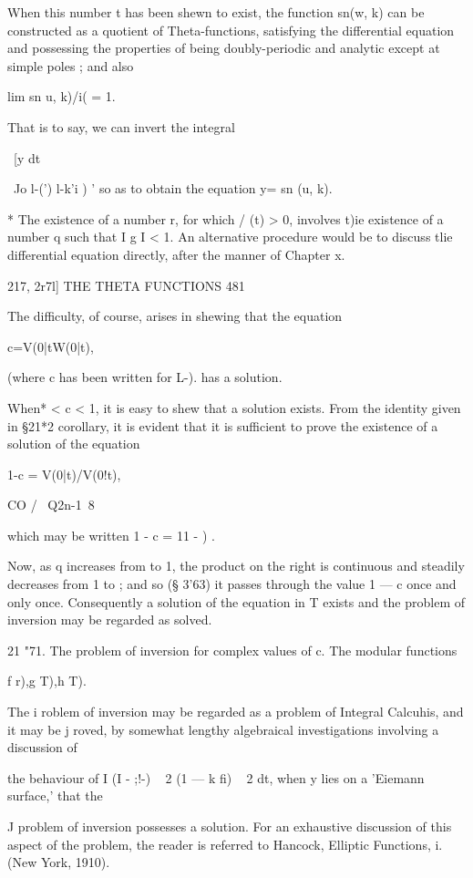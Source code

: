 When this number t has been shewn to exist, the function sn(w, k) can
be constructed as a quotient of Theta-functions, satisfying the
differential equation and possessing the properties of being
doubly-periodic and analytic except at simple poles ; and also

lim sn u, k)/i( = 1.

That is to say, we can invert the integral

\ [y dt

 ~Jo l-(') l-k'i ) ' so as to obtain the equation y= sn (u, k).

* The existence of a number r, for which / (t) > 0, involves t)ie
existence of a number q such that I g I < 1. An alternative procedure
would be to discuss tlie differential equation directly, after the
manner of Chapter x.

217, 2r7l] THE THETA FUNCTIONS 481

The difficulty, of course, arises in shewing that the equation

c=V(0|tW(0|t),

(where c has been written for L-). has a solution.

When* < c < 1, it is easy to shew that a solution exists. From the
identity given in §21*2 corollary, it is evident that it is sufficient
to prove the existence of a solution of the equation

1-c = V(0|t)/V(0!t),

CO / \ Q2n-1\ 8

which may be written 1 - c = 11 - ) .

Now, as q increases from to 1, the product on the right is continuous
and steadily decreases from 1 to ; and so (§ 3'63) it passes through
the value 1 — c once and only once. Consequently a solution of the
equation in T exists and the problem of inversion may be regarded as
solved.

21 "71. The problem of inversion for complex values of c. The modular
functions

f r),g T),h T).

The i roblem of inversion may be regarded as a problem of Integral
Calcuhis, and it may be j roved, by somewhat lengthy algebraical
investigations involving a discussion of

the behaviour of I (I - ;!-) ~ 2 (1 — k fi) ~ 2 dt, when y lies on a
'Eiemann surface,' that the

J problem of inversion possesses a solution. For an exhaustive
discussion of this aspect of the problem, the reader is referred to
Hancock, Elliptic Functions, i. (New York, 1910).

